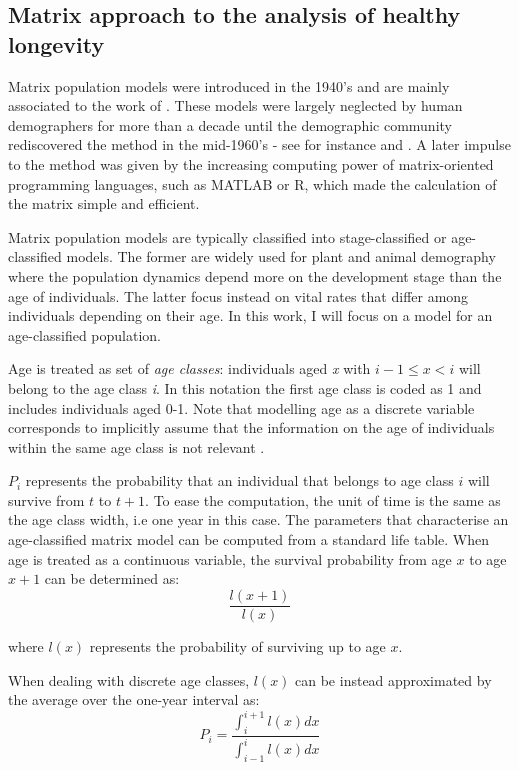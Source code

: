 \documentclass[../main.tex]{subfiles}
\begin{document}
\subsection{Matrix approach to the analysis of healthy longevity}

Matrix population models were introduced in the 1940's and are mainly associated to the work of \citet{Leslie1945, Leslie1948}. These models were largely neglected by human demographers for more than a decade until the demographic community rediscovered the method in the mid-1960's - see for instance \cite{Keyfitz1964} and \cite{Rogers1966}. A later impulse to the method was given by the increasing computing power of matrix-oriented programming languages, such as MATLAB or R, which made the calculation of the matrix simple and efficient. 

Matrix population models are typically classified into stage-classified or age-classified models. The former are widely used for plant and animal demography where the population dynamics depend more on the development stage than the age of individuals. The latter focus instead on vital rates that differ among individuals depending on their age. In this work, I will focus on a model for an age-classified population.

Age is treated as set of \textit{age classes}: individuals aged \textit{x} with $i-1 \leq x < i$ will belong to the age class  \textit{i}. In this notation the first age class is coded as 1 and includes individuals aged 0-1.
Note that  modelling age as a discrete variable corresponds to implicitly assume that the information on the age of individuals within the same age class is not relevant \citep{Keyfitz2005}. 

$P_i$ represents the probability that an individual that belongs to age class $i$ will survive from $t$ to $t+1$. To ease the computation, the unit of time is the same as the age class width, i.e one year in this case.
The parameters that characterise an age-classified matrix model can be computed from a standard life table. When age is treated as a continuous variable, the survival probability from age $x$ to age $x+1$ can be determined as:
\begin{equation}
    \frac{l(x+1)}{l(x)}
\end{equation}

\noindent where $l(x)$ represents the probability of surviving up to age $x$.


\noindent When dealing with discrete age classes, $l(x)$ can be instead approximated by the average over the one-year interval as:
\begin{equation}
    P_i = \frac{\int_{i}^{i+1} l(x) dx}{\int_{i-1}^{i} l(x) dx}
\end{equation}
\end{document}

